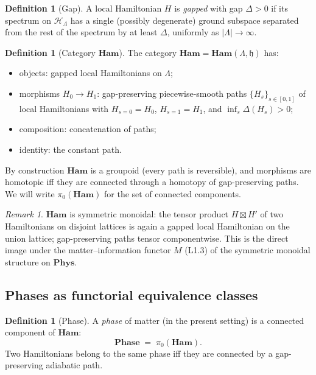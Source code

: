 \documentclass[12pt]{article}
\theoremstyle{plain}
\theoremstyle{definition}
\newtheorem{definition}[theorem]{Definition}
\theoremstyle{remark}
\newtheorem{remark}[theorem]{Remark}
\newcommand{\Ham}{\mathbf{Ham}}
\newcommand{\Phys}{\mathbf{Phys}}
\newcommand{\Phase}{\mathbf{Phase}}
\begin{document}
\begin{definition}[Gap]
\label{def:gap}
A local Hamiltonian $H$ is \emph{gapped} with gap $\Delta>0$ if its spectrum on
$\mathcal{H}_{\Lambda}$ has a single (possibly degenerate) ground subspace separated
from the rest of the spectrum by at least $\Delta$, uniformly as $|\Lambda|\to\infty$.
\end{definition}

\begin{definition}[Category $\Ham$]
\label{def:ham-cat}
The category $\Ham=\Ham(\Lambda,\mathfrak{h})$ has:
\begin{itemize}
  \item objects: gapped local Hamiltonians on $\Lambda$;
  \item morphisms $H_{0}\to H_{1}$: gap-preserving piecewise-smooth paths
    $\{H_{s}\}_{s\in[0,1]}$ of local Hamiltonians with $H_{s=0}=H_{0}$, $H_{s=1}=H_{1}$,
    and $\inf_{s}\Delta(H_{s})>0$;
  \item composition: concatenation of paths;
  \item identity: the constant path.
\end{itemize}
\end{definition}

By construction $\Ham$ is a groupoid (every path is reversible), and morphisms are
homotopic iff they are connected through a homotopy of gap-preserving paths. We will
write $\pi_{0}(\Ham)$ for the set of connected components.

\begin{remark}
$\Ham$ is symmetric monoidal: the tensor product
$H \boxtimes H'$ of two Hamiltonians on disjoint lattices is again a gapped local
Hamiltonian on the union lattice; gap-preserving paths tensor componentwise. This is the
direct image under the matter--information functor $M$ (L1.3) of the symmetric monoidal
structure on $\Phys$.
\end{remark}

\subsection{Phases as functorial equivalence classes}

\begin{definition}[Phase]
\label{def:phase}
A \emph{phase} of matter (in the present setting) is a connected component of $\Ham$:
\[
\Phase \;=\; \pi_{0}(\Ham).
\]
Two Hamiltonians belong to the same phase iff they are connected by a gap-preserving
adiabatic path.
\end{definition}
\end{document}
